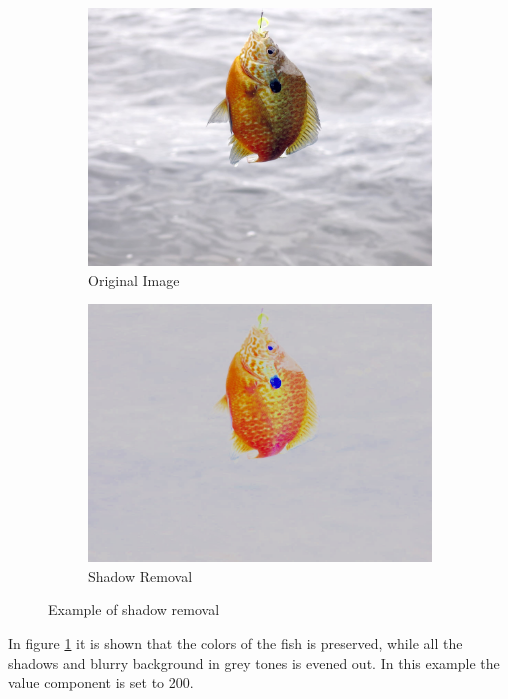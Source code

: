 \begin{figure}[h]
    \centering
    \begin{subfigure}{0.5\textwidth}
        \centering
        \includegraphics[width=.9\linewidth]{Images/colorfish}
        \caption{Original Image}
    \end{subfigure}%
    \begin{subfigure}{.5\textwidth}
        \centering
        \includegraphics[width=.9\linewidth]{Images/shadow_removal}
        \caption{Shadow Removal}
    \end{subfigure}
    \caption{Example of shadow removal}
    \label{fig:shadow_removal}
\end{figure}

In figure \ref{fig:shadow_removal} it is shown that the colors of the fish is preserved, while all the shadows and blurry background in grey tones is evened out. In this example the value component is set to 200.

